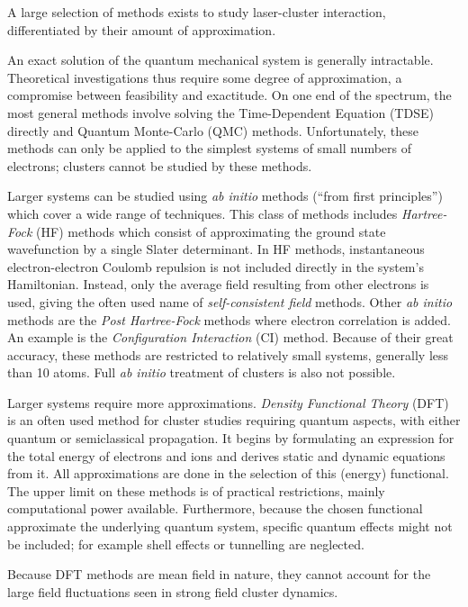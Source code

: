 A large selection of methods exists to study laser-cluster interaction,
differentiated by their amount of approximation.

An exact solution of the quantum mechanical system is generally
intractable. Theoretical investigations thus require some degree of
approximation, a compromise between feasibility and exactitude. On one end of
the spectrum, the most general methods involve solving the
Time-Dependent \schrodinger Equation (TDSE) directly and Quantum Monte-Carlo
(QMC) methods\cite{Nightingale1998}. Unfortunately, these methods can only be applied to the simplest
systems of small numbers of electrons; clusters cannot be studied by these
methods.

Larger systems can be studied using \textit{ab initio} methods (``from
first principles'') which cover a wide range of techniques. This class of
methods includes \textit{Hartree-Fock} (HF) methods which consist of
approximating the ground state wavefunction by a single Slater
determinant\cite{Laaksonen1986,Schafer2009}.
In HF methods, instantaneous electron-electron Coulomb repulsion is not
included directly in the system's Hamiltonian. Instead, only the average field
resulting from other electrons is used, giving the often used name of
\textit{self-consistent field} methods. Other \textit{ab
initio} methods are the \textit{Post Hartree-Fock} methods where electron
correlation is added\cite{Cramer2004}. An example is the \textit{Configuration Interaction} (CI)
method. Because of their great accuracy, these methods are restricted to
relatively small systems, generally less than 10 atoms. Full \textit{ab initio}
treatment of clusters is also not possible.

Larger systems require
more approximations. \textit{Density Functional Theory} (DFT)
is an often used method for cluster studies requiring quantum aspects, with
either quantum or semiclassical propagation\cite{Schafer2009,Fennel2010}.
It begins by formulating an
expression for the total energy of electrons and ions and derives static and
dynamic equations from it. All approximations are done in the selection of this
(energy) functional. The upper limit on these methods is of practical restrictions,
mainly computational power available. Furthermore, because the chosen
functional approximate the underlying quantum system, specific quantum effects
might not be included; for example shell effects or tunnelling are neglected.

Because DFT methods are mean field in nature, they cannot account for the large
field fluctuations seen in strong field cluster dynamics.

